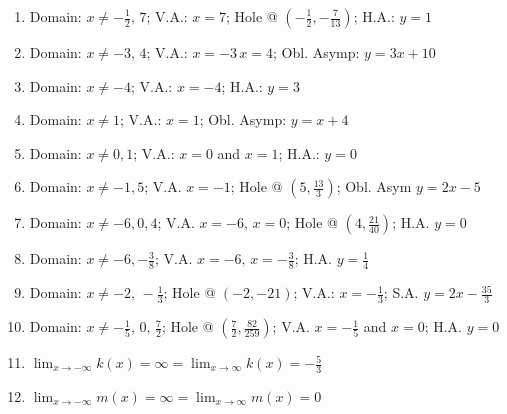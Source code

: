 \begin{enumerate}
    \item Domain: $x \neq -\frac{1}{2}, \, 7$; V.A.: $x=7$; Hole @ $\left(-\frac{1}{2},-\frac{7}{13}\right)$; H.A.: $y=1$
    \item Domain: $x \neq -3, \, 4$; V.A.: $x=-3 \, x = 4$; Obl. Asymp: $y = 3x+10$
    \item Domain: $x \neq -4$; V.A.: $x = -4$; H.A.: $y = 3$
    \item Domain: $x \neq 1$; V.A.: $x = 1$; Obl. Asymp: $y = x + 4$
    \item Domain: $x \neq 0, 1$; V.A.: $x = 0$ and $x = 1$; H.A.: $y = 0$ 
    \item Domain: $x \neq -1, 5$; V.A. $x=-1$; Hole @ $\left(5, \frac{13}{3}\right)$; Obl. Asym $y = 2x-5$
    \item Domain: $x \neq -6, 0, 4$; V.A. $x = -6, \, x = 0$; Hole @ $\left(4, \frac{21}{40}\right)$; H.A. $y = 0$
    \item Domain: $x \neq -6, -\frac{3}{8}$; V.A. $x = -6, \, x = -\frac{3}{8}$; H.A. $y = \frac{1}{4}$
    \item Domain: $x \neq -2, \, -\frac{1}{3}$; Hole @ $(-2,-21)$; V.A.: $x = -\frac{1}{3}$; S.A. $y = 2x-\frac{35}{3}$
    \item Domain: $x \neq -\frac{1}{5}, \, 0, \, \frac{7}{2}$; Hole @ $\left(\frac{7}{2}, \frac{82}{259}\right)$; V.A. $x = -\frac{1}{5}$ and $x=0$; H.A. $y=0$
    
    \item $\lim_{x \to -\infty} k(x) = \infty = \lim_{x \to \infty} k(x) = -\frac{5}{3}$
    \item $\lim_{x \to -\infty} m(x) = \infty = \lim_{x \to \infty} m(x) = 0$
\end{enumerate}